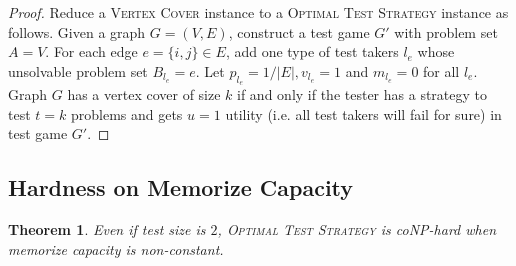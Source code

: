 \documentclass{article}
\newtheorem{theorem}{Theorem}
\begin{document}
\begin{proof}
	Reduce a \textsc{Vertex Cover} instance to a \textsc{Optimal Test
	Strategy} instance as follows. Given a graph $G = (V, E)$, construct a
	test game $G'$ with problem set $A = V$.  For each edge $e = \{i, j\}
	\in E$, add one type of test takers $l_e$ whose unsolvable problem set
	$B_{l_e} = e$. Let $p_{l_e} = 1/|E|, v_{l_e} = 1$ and $m_{l_e} = 0$ for
	all $l_e$.  Graph $G$ has a vertex cover of size $k$ if and only if the
	tester has a strategy to test $t = k$ problems and gets $u=1$ utility
	(i.e. all test takers will fail for sure) in test game $G'$.
\end{proof}

\subsection{Hardness on Memorize Capacity}


\begin{theorem}\label{thm:memorize-hardness}
Even if test size is $2$, \textsc{Optimal Test Strategy} is coNP-hard when
memorize capacity is non-constant.
\end{theorem}
\end{document}
